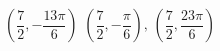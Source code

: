 { $\left( \dfrac{7}{2}, -\dfrac{13\pi}{6} \right)$}
{$\left( \dfrac{7}{2}, -\dfrac{\pi}{6} \right), \, \left( \dfrac{7}{2}, \dfrac{23\pi}{6} \right)$\\ }
